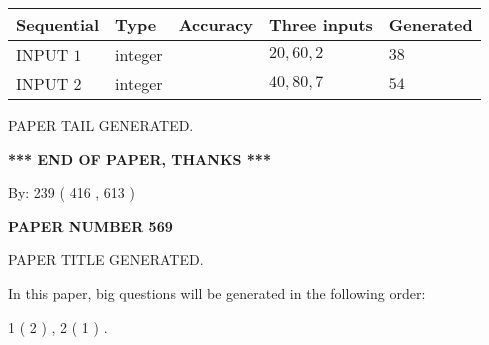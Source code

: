 \documentclass[12pt]{article}
\begin{document}
   
  
  
\noindent\begin{tabular}{|l|l|l|l|l|}
\hline
 Sequential & Type & Accuracy & Three inputs & Generated \\ 
\hline
 
 
  INPUT $  1 $ & integer &  & $
 20
 , 
 60
 , 
 2
 $ & $ 38 $ 
 \\  \hline  
 
 
  INPUT $  2 $ & integer &  & $
 40
 , 
 80
 , 
 7
 $ & $ 54 $ 
 \\  \hline  
 \end{tabular}
   
   
   
   
   
   
 \vspace{0.2in}
 
   
   
\vspace{2.0in} PAPER TAIL GENERATED.
   
   
   
   
\vspace{1.0in} 
{\textbf{\large{ *** END OF PAPER, THANKS *** }}} 
   
   
\hspace{1.0in} By: 
 239 ( 416 ,  613 )
   
   
   
   
\newpage 
\setcounter{page}{ 
   569001 } 
   
   
   
   
 {\textbf{ \Large{ PAPER NUMBER  569  }}}
   
   
\vspace{0.2in}
   
   
   
   
   
   
   
   
 \vspace{0.2in}
 
 
 
 
   
   
 PAPER TITLE GENERATED.
   
   
   
\vspace{0.2in}
   
In this paper, big questions will be generated in the following order: 
   
   
   1 ( 2 )
 ,
   2 ( 1 )
 .
  
\end{document}
